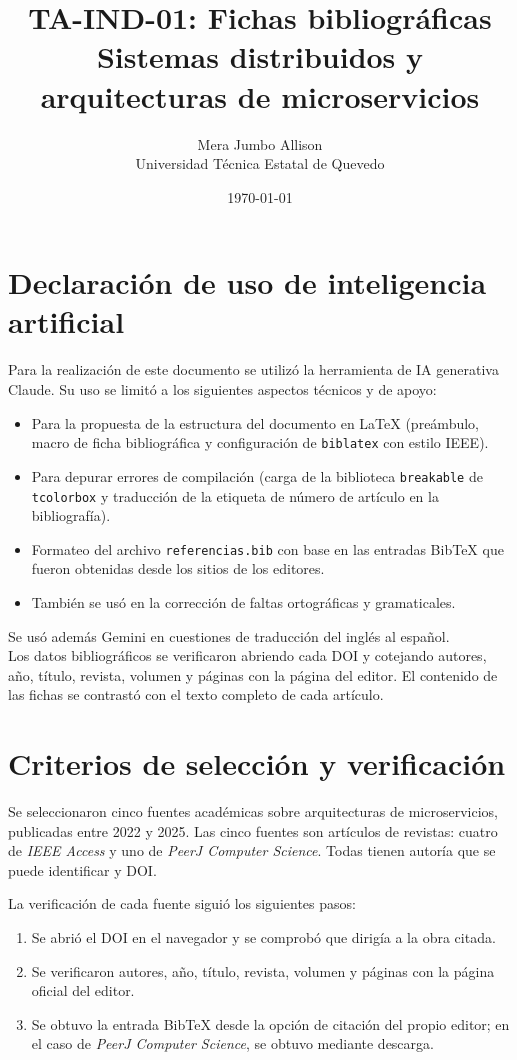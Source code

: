 \documentclass[11pt,a4paper]{article}
\title{TA-IND-01: Fichas bibliográficas\\
\large Sistemas distribuidos y arquitecturas de microservicios}
\author{Mera Jumbo Allison\\
Universidad Técnica Estatal de Quevedo\\}
\date{\today}
\begin{document}
\maketitle

\section*{Declaración de uso de inteligencia artificial}
Para la realización de este documento se utilizó la herramienta de IA generativa Claude. Su uso se limitó a los siguientes aspectos técnicos y de apoyo:
\begin{itemize}[nosep]
    \item Para la propuesta de la estructura del documento en \LaTeX{} (preámbulo, macro de ficha bibliográfica y configuración de \texttt{biblatex} con estilo IEEE).
    \item Para depurar errores de compilación (carga de la biblioteca \texttt{breakable} de \texttt{tcolorbox} y traducción de la etiqueta de número de artículo en la bibliografía).
    \item Formateo del archivo \texttt{referencias.bib} con base en las entradas BibTeX que fueron obtenidas desde los sitios de los editores.
    \item También se usó en la corrección de faltas ortográficas y gramaticales.
\end{itemize}
Se usó además Gemini en cuestiones de traducción del inglés al español.\\
Los datos bibliográficos se verificaron abriendo cada DOI y cotejando autores, año, título, revista, volumen y páginas con la página del editor. El contenido de las fichas se contrastó con el texto completo de cada artículo.

\section{Criterios de selección y verificación}
Se seleccionaron cinco fuentes académicas sobre arquitecturas de microservicios, publicadas entre 2022 y 2025. Las cinco fuentes son artículos de revistas: cuatro de \textit{IEEE Access} y uno de \textit{PeerJ Computer Science}. Todas tienen autoría que se puede identificar y DOI.

La verificación de cada fuente siguió los siguientes pasos:
\begin{enumerate}[nosep]
    \item Se abrió el DOI en el navegador y se comprobó que dirigía a la obra citada.
    \item Se verificaron autores, año, título, revista, volumen y páginas con la página oficial del editor.
    \item Se obtuvo la entrada BibTeX desde la opción de citación del propio editor; en el caso de \textit{PeerJ Computer Science}, se obtuvo mediante descarga.
\end{enumerate}
\end{document}
